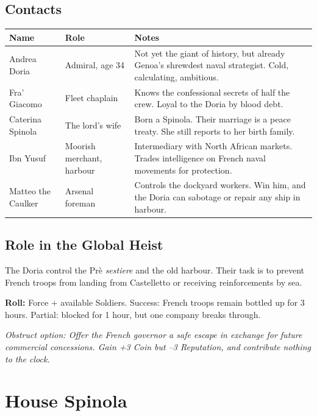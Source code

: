 \section{Contacts}

\begin{center}
\begin{tabularx}{\textwidth}{L{2.8cm} L{2.8cm} X}
  \toprule
  \textbf{Name} & \textbf{Role} & \textbf{Notes} \\
  \midrule
  Andrea Doria      & Admiral, age 34         & Not yet the giant of history, but already Genoa's shrewdest naval strategist. Cold, calculating, ambitious. \\
  Fra' Giacomo      & Fleet chaplain           & Knows the confessional secrets of half the crew. Loyal to the Doria by blood debt. \\
  Caterina Spinola  & The lord's wife          & Born a Spinola. Their marriage is a peace treaty. She still reports to her birth family. \\
  Ibn Yusuf         & Moorish merchant, harbour& Intermediary with North African markets. Trades intelligence on French naval movements for protection. \\
  Matteo the Caulker& Arsenal foreman          & Controls the dockyard workers. Win him, and the Doria can sabotage or repair any ship in harbour. \\
  \bottomrule
\end{tabularx}
\end{center}

\section{Role in the Global Heist}

The Doria control the Prè \textit{sestiere} and the old harbour. Their task
is to prevent French troops from landing from Castelletto or receiving
reinforcements by sea.

\textbf{Roll:} Force + available Soldiers. Success: French troops remain
bottled up for 3 hours. Partial: blocked for 1 hour, but one company breaks through.

\textit{Obstruct option: Offer the French governor a safe escape in exchange
for future commercial concessions. Gain +3 Coin but --3 Reputation, and
contribute nothing to the clock.}

\chapter{House Spinola}
\label{ch:spinola}

